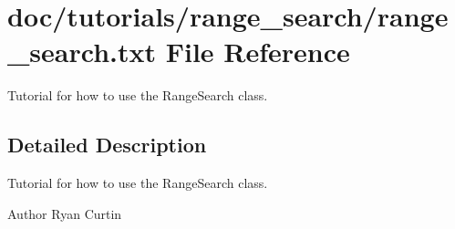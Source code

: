 \section{doc/tutorials/range\+\_\+search/range\+\_\+search.txt File Reference}
\label{range__search_8txt}


Tutorial for how to use the Range\+Search class.  




\subsection{Detailed Description}
Tutorial for how to use the Range\+Search class. 

\begin{DoxyAuthor}{Author}
Ryan Curtin 
\end{DoxyAuthor}
